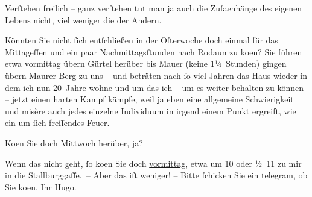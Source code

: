 \pstart
           Verſtehen freilich – ganz verſtehen tut man ja auch die Zuſa{\geminationm}enhänge des eigenen Lebens nicht, viel weniger die der
               Andern.\pend
           
\pstart
           Könnten Sie nicht ſich entſchließen in der Oſterwoche doch einmal für
               das Mittageſſen und ein paar Nachmittagsſtunden nach Rodaun zu ko{\geminationm}en? {\pb}Sie führen etwa vormittag übern
                  Gürtel herüber bis Mauer (keine 1¼ Stunden) gingen übern Maurer Berg zu uns – und beträten nach ſo viel Jahren das Haus wieder in dem ich nun
               20 Jahre wohne und um das ich – um es weiter behalten zu können – jetzt einen harten
               Kampf kämpfe, weil ja eben eine {\pb}allgemeine Schwierigkeit und misère auch jedes einzelne Individuum in irgend einem
               Punkt ergreift, wie ein um ſich freſſendes Feuer.\pend
           
\pstart
           Ko{\geminationm}en Sie doch Mittwoch herüber, ja?\pend
           
\pstart
           Wenn das nicht geht, ſo ko{\geminationm}en Sie doch \label{K_L02364-1v}\label{K_L02364-1}{ }\uline{vormittag}, etwa um 10 oder ½ 11 zu mir in die Stallburggaſſe. – Aber das iſt weniger! – Bitte
               ſchicken Sie ein telegram, ob Sie ko{\geminationm}en.\pend
           \pstart Ihr \spacefill\mbox{Hugo.}\pend{}\endnumbering{}  
      